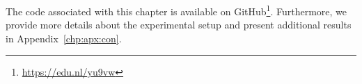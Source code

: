 The code associated with this chapter is available on GitHub\footnote{\url{https://edu.nl/yu9vw}}.
Furthermore, we provide more details about the experimental setup and present additional results in Appendix~\ref{chp:apx:con}.

